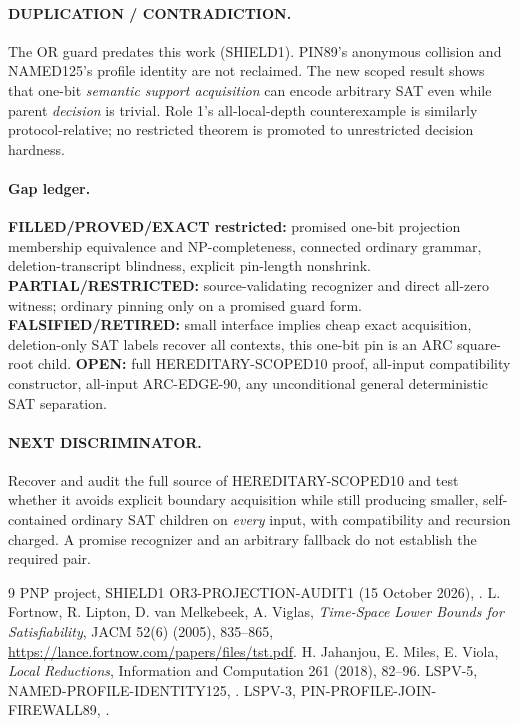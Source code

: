 \documentclass[11pt]{article}
\begin{document}
\paragraph{DUPLICATION / CONTRADICTION.}
The OR guard predates this work (SHIELD1). PIN89's anonymous collision and NAMED125's profile identity are not reclaimed. The new scoped result shows that one-bit \emph{semantic support acquisition} can encode arbitrary SAT even while parent \emph{decision} is trivial. Role 1's all-local-depth counterexample is similarly protocol-relative; no restricted theorem is promoted to unrestricted decision hardness.

\paragraph{Gap ledger.}
\textbf{FILLED/PROVED/EXACT restricted:} promised one-bit projection membership equivalence and NP-completeness, connected ordinary grammar, deletion-transcript blindness, explicit pin-length nonshrink.
\textbf{PARTIAL/RESTRICTED:} source-validating recognizer and direct all-zero witness; ordinary pinning only on a promised guard form.
\textbf{FALSIFIED/RETIRED:} small interface implies cheap exact acquisition, deletion-only SAT labels recover all contexts, this one-bit pin is an ARC square-root child.
\textbf{OPEN:} full HEREDITARY-SCOPED10 proof, all-input compatibility constructor, all-input ARC-EDGE-90, any unconditional general deterministic SAT separation.
\paragraph{NEXT DISCRIMINATOR.}
Recover and audit the full source of HEREDITARY-SCOPED10 and test whether it avoids explicit boundary acquisition while still producing smaller, self-contained ordinary SAT children on \emph{every} input, with compatibility and recursion charged. A promise recognizer and an arbitrary fallback do not establish the required pair.
\begin{thebibliography}{9}
 PNP project, SHIELD1 OR3-PROJECTION-AUDIT1 (15 October 2026), .
 L. Fortnow, R. Lipton, D. van Melkebeek, A. Viglas, \emph{Time-Space Lower Bounds for Satisfiability}, JACM 52(6) (2005), 835--865, \url{https://lance.fortnow.com/papers/files/tst.pdf}.
 H. Jahanjou, E. Miles, E. Viola, \emph{Local Reductions}, Information and Computation 261 (2018), 82--96.
 LSPV-5, NAMED-PROFILE-IDENTITY125, .
 LSPV-3, PIN-PROFILE-JOIN-FIREWALL89, .
\end{thebibliography}
\end{document}
